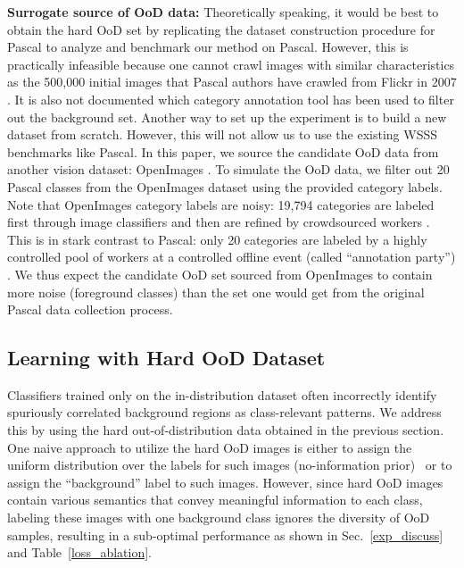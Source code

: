 \documentclass[10pt,twocolumn,letterpaper]{article}
\begin{document}
\textbf{Surrogate source of OoD data:}
Theoretically speaking, it would be best to obtain the hard OoD set by replicating the dataset construction procedure for Pascal \cite{everingham2010pascal} to analyze and benchmark our method on Pascal. 
However, this is practically infeasible because one cannot crawl images with similar characteristics as the 500,000 initial images that Pascal authors have crawled from Flickr in 2007 \cite{everingham2010pascal}. It is also not documented which category annotation tool has been used to filter out the background set.
Another way to set up the experiment is to build a new dataset from scratch.
However, this will not allow us to use the existing WSSS benchmarks like Pascal. 
In this paper, we source the candidate OoD data from another vision dataset: OpenImages \cite{kuznetsova2020open}. 
To simulate the OoD data, we filter out 20 Pascal classes from the OpenImages dataset using the provided category labels.
Note that OpenImages category labels are noisy: 19,794 categories are labeled first through image classifiers and then are refined by crowdsourced workers \cite{kuznetsova2020open}.
This is in stark contrast to Pascal: only 20 categories are labeled by a highly controlled pool of workers at a controlled offline event (called ``annotation party'') \cite{everingham2010pascal}. 
We thus expect the candidate OoD set sourced from OpenImages to contain more noise (\ie foreground classes) than the set one would get from the original Pascal data collection process.





































\subsection{Learning with Hard OoD Dataset}\label{method_proposed}
Classifiers trained only on the in-distribution dataset  often incorrectly identify spuriously correlated background regions as class-relevant patterns.
We address this by using the hard out-of-distribution data  obtained in the previous section. 
One naive approach to utilize the hard OoD images is either to assign the uniform distribution over the labels for such images (no-information prior)~\cite{hendrycks2018deep, lee2017training, lee2021removing} or to assign the ``background'' label to such images.
However, since hard OoD images contain various semantics that convey meaningful information to each class, labeling these images with one background class ignores the diversity of OoD samples, resulting in a sub-optimal performance as shown in Sec.~\ref{exp_discuss} and Table~\ref{loss_ablation}.
\end{document}
